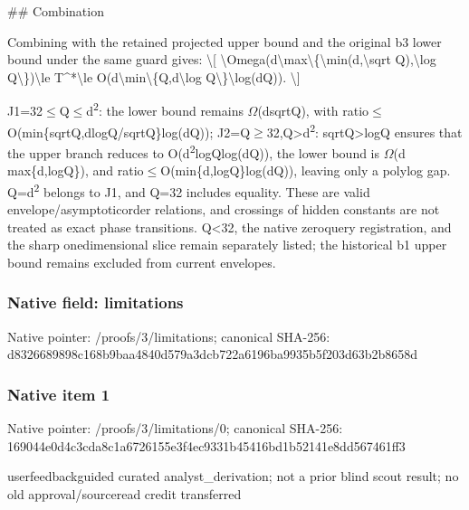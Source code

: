 \documentclass[10pt,a4paper]{article}
\begin{document}
\#\# Combination

Combining with the retained projected upper bound and the original b3 lower bound under the same guard gives:
\textbackslash{}[
\textbackslash{}Omega(d\textbackslash{}max\textbackslash{}\{\textbackslash{}min(d,\textbackslash{}sqrt Q),\textbackslash{}log Q\textbackslash{}\})\textbackslash{}le T\textasciicircum{}*\textbackslash{}le O(d\textbackslash{}min\textbackslash{}\{Q,d\textbackslash{}log Q\textbackslash{}\}\textbackslash{}log(dQ)).
\textbackslash{}]

J1=32\ensuremath{\le}Q\ensuremath{\le}d\textsuperscript{2}: the lower bound remains \ensuremath{\Omega}(dsqrtQ), with ratio\ensuremath{\le}O(min\{sqrtQ,dlogQ/sqrtQ\}log(dQ)); J2=Q\ensuremath{\ge}32,Q>d\textsuperscript{2}: sqrtQ>logQ ensures that the upper branch reduces to O(d\textsuperscript{2}logQlog(dQ)), the lower bound is \ensuremath{\Omega}(d max\{d,logQ\}), and ratio\ensuremath{\le}O(min\{d,logQ\}log(dQ)), leaving only a polylog gap. Q=d\textsuperscript{2} belongs to J1, and Q=32 includes equality. These are valid envelope/asymptoticorder relations, and crossings of hidden constants are not treated as exact phase transitions. Q<32, the native zeroquery registration, and the sharp onedimensional slice remain separately listed; the historical b1 upper bound remains excluded from current envelopes.



\subsubsection{Native field: limitations}


Native pointer: /proofs/3/limitations; canonical SHA-256: d8326689898c168b9baa4840\allowbreak{}d579a3dcb722a6196ba9935b\allowbreak{}5f203d63b2b8658d



\subsubsection{Native item 1}


Native pointer: /proofs/3/limitations/0; canonical SHA-256: 169044e0d4c3cda8c1a67261\allowbreak{}55e3f4ec9331b45416bd1b52\allowbreak{}141e8dd567461ff3


userfeedbackguided curated analyst\_derivation; not a prior blind scout result; no old approval/sourceread credit transferred
\end{document}
